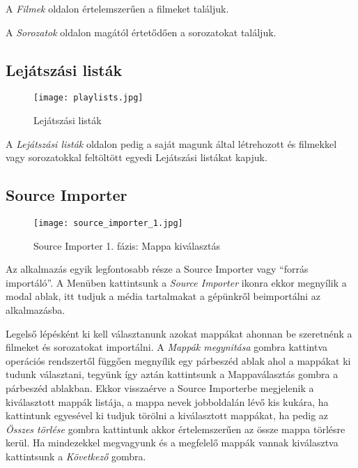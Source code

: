 A {\it Filmek} oldalon értelemszerűen a filmeket találjuk.

A {\it Sorozatok} oldalon magától értetődően a sorozatokat találjuk.

\cleardoublepage
\subsection{Lejátszási listák}
\begin{figure}[H]
	\centering
	\texttt{[image: playlists.jpg]}
	\caption{Lejátszási listák}
	\label{fig:playlists}
\end{figure}
A {\it Lejátszási listák} oldalon pedig a saját magunk által létrehozott és filmekkel vagy sorozatokkal feltöltött egyedi Lejátszási listákat kapjuk.

\cleardoublepage
\subsection{Source Importer}
\begin{figure}[H]
	\centering
	\texttt{[image: source\_importer\_1.jpg]}
	\caption{Source Importer 1. fázis: Mappa kiválasztás}
	\label{fig:source_importer}
\end{figure}
Az alkalmazás egyik legfontosabb része a Source Importer vagy ``forrás importáló''. A Menüben kattintsunk a {\it Source Importer} ikonra ekkor megnyílik a modal ablak, itt tudjuk a média tartalmakat a gépünkről beimportálni az alkalmazásba.

Legelső lépésként ki kell választanunk azokat mappákat ahonnan be szeretnénk a filmeket és sorozatokat importálni. A {\it Mappák megynitása} gombra kattintva operációs rendszertől függően megnyílik egy párbeszéd ablak ahol a mappákat ki tudunk választani, tegyünk így aztán kattintsunk a Mappaválasztás gombra a párbeszéd ablakban. Ekkor visszaérve a Source Importerbe megjelenik a kiválasztott mappák listája, a mappa nevek jobboldalán lévő kis kukára, ha kattintunk egyesével ki tudjuk törölni a kiválasztott mappákat, ha pedig az {\it Összes törlése} gombra kattintunk akkor értelemszerűen az össze mappa törlésre kerül. Ha mindezekkel megvagyunk és a megfelelő mappák vannak kiválasztva kattintsunk a {\it Következő} gombra.


